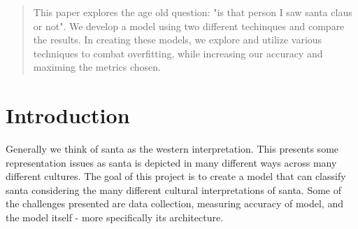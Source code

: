 \author{
    \emph{Team name}: IS SANTA REAL\\
    \emph{TA name:} David Grossman
    Brown University\\
}

\maketitle

\begin{abstract}
This paper explores the age old question: "is that person I saw santa claus or not". 
We develop a model using two different techinques and compare the results. In creating these models, we explore and utilize various techniques to combat overfitting, while increasing our accuracy and maximing the metrics chosen. 
\end{abstract}


\section{Introduction}

Generally we think of santa as the western interpretation. This presents some representation issues as santa is depicted in many different ways across many different cultures. The goal of this project is to create a model that can classify santa considering the many different cultural interpretations of santa. Some of the challenges presented are data collection, measuring accuracy of model, and the model itself - more specifically its architecture.


